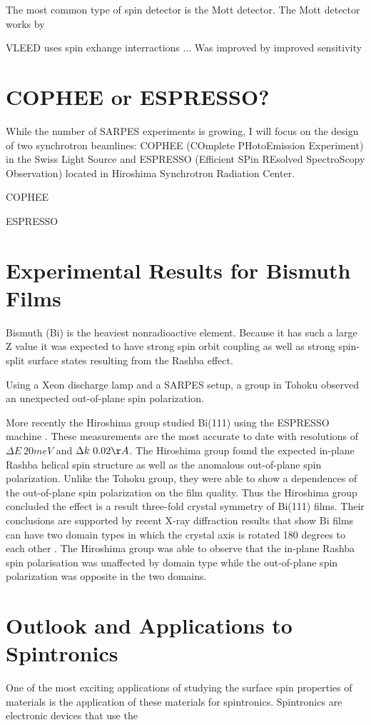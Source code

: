 \documentclass[12pt]{article}
\begin{document}
The most common type of spin detector is the Mott detector.
The Mott detector works by

VLEED uses spin exhange interractions ...
Was improved by \cite{Fe paper}
improved sensitivity

\section{COPHEE or ESPRESSO?}
While the number of SARPES experiments is growing, I will focus on the design of two synchrotron beamlines:  COPHEE (COmplete PHotoEmission Experiment) in the Swiss Light Source and ESPRESSO (Efficient SPin REsolved SpectroScopy Observation) located in Hiroshima Synchrotron Radiation Center.

COPHEE 

ESPRESSO
\section{Experimental Results for Bismuth Films}
Bismuth (Bi) is the heaviest nonradioactive element.
Because it has such a large Z value it was expected to have strong spin orbit coupling as well as strong spin-split surface states resulting from the Rashba effect.

Using a Xeon discharge lamp and a SARPES setup, a group in Tohoku observed an unexpected out-of-plane spin polarization\cite{Takayama}.

More recently the Hiroshima group studied Bi(111) using the ESPRESSO machine \cite{Miyahara}.
These measurements are the most accurate to date with resolutions of $\Delta E~20meV$ and $\Delta k~0.02\AA$.
The Hiroshima group found the expected in-plane Rashba helical spin structure as well as the anomalous out-of-plane spin polarization.
Unlike the Tohoku group, they were able to show a dependences of the out-of-plane spin polarization on the film quality.
Thus the Hiroshima group concluded the effect is a result three-fold crystal symmetry of Bi(111) films.
Their conclusions are supported by recent X-ray diffraction results that show Bi films can have two domain types in which the crystal axis is rotated 180 degrees to each other \cite{Shirasawa}.
The Hiroshima group was able to observe that the in-plane Rashba spin polarisation was unaffected by domain type while the out-of-plane spin polarization was opposite in the two domains.




\section{Outlook and Applications to Spintronics}
One of the most exciting applications of studying the surface spin properties of materials is the application of these materials for spintronics.
Spintronics are electronic devices that use the



\section{}



\end{document}

